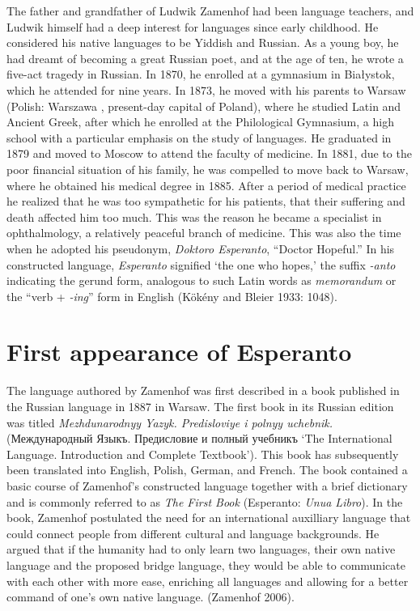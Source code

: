 The father and grandfather of Ludwik Zamenhof had been language teachers, and Ludwik himself had a deep interest for languages since early childhood.
He considered his native languages to be Yiddish and Russian.
As a young boy, he had dreamt of becoming a great Russian poet, and at the age of ten, he wrote a five-act tragedy in Russian.
In 1870, he enrolled at a gymnasium in Białystok, which he attended for nine years.
In 1873, he moved with his parents to Warsaw (Polish: Warszawa \ipa{[varˈʂava]}, present-day capital of Poland), where he studied Latin and Ancient Greek, after which he enrolled at the Philological Gymnasium, a high school with a particular emphasis on the study of languages.
He graduated in 1879 and moved to Moscow to attend the faculty of medicine.
In 1881, due to the poor financial situation of his family, he was compelled to move back to Warsaw, where he obtained his medical degree in 1885.
After a period of medical practice he realized that he was too sympathetic for his patients, that their suffering and death affected him too much.
This was the reason he became a specialist in ophthalmology, a relatively peaceful branch of medicine.
This was also the time when he adopted his pseudonym, \textit{Doktoro Esperanto}, ``Doctor Hopeful.''
In his constructed language, \textit{Esperanto} signified `the one who hopes,'
the suffix \textit{-anto} indicating the gerund form, analogous to such Latin words as \textit{memorandum} or the ``verb + \textit{-ing}'' form in English
(Kökény and Bleier 1933: 1048).

\section{First appearance of Esperanto}
The language authored by Zamenhof was first described in a book published in the Russian language in 1887 in Warsaw.
The first book in its Russian edition was titled \textit{Mezhdunarodnyy Yazyk. Predisloviye i polnyy uchebnik.}
({\cyrfont Между\-на\-род\-ный Языкъ. Предисловие и полный учебникъ `The International Language. Introduction and Complete Textbook'}).
This book has subsequently been translated into English, Polish, German, and French.
The book contained a basic course of Zamenhof's constructed language together with a brief dictionary and is commonly referred to as \textit{The First Book} (Esperanto: \textit{Unua Libro}).
In the book, Zamenhof postulated the need for an international auxilliary language that could connect people from different cultural and language backgrounds.
He argued that if the humanity had to only learn two languages, their own native language and the proposed bridge language, they would be able to communicate with each other with more ease, enriching all languages and allowing for a better command of one's own native language.
(Zamenhof 2006).

